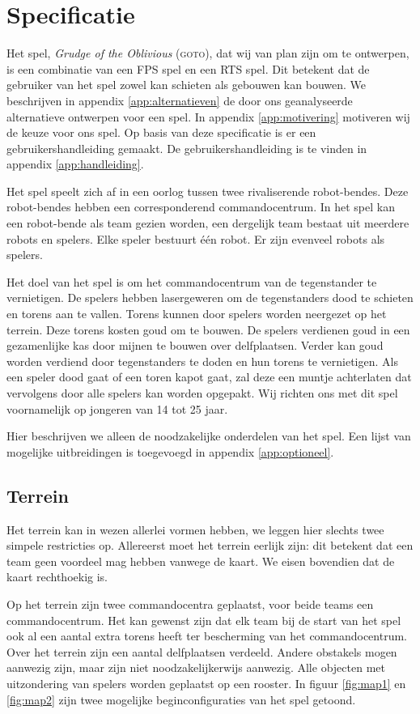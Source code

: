     \section{Specificatie}
    Het spel, \emph{Grudge of the Oblivious} (\textsc{goto}), dat wij van plan zijn om te ontwerpen, is een combinatie van een FPS spel en een RTS spel. Dit betekent dat de gebruiker van het spel zowel kan schieten als gebouwen kan bouwen. We beschrijven in appendix \ref{app:alternatieven} de door ons geanalyseerde alternatieve ontwerpen voor een spel. In appendix \ref{app:motivering} motiveren wij de keuze voor ons spel. Op basis van deze specificatie is er een gebruikershandleiding gemaakt. De gebruikershandleiding is te vinden in appendix \ref{app:handleiding}. 
    
    Het spel speelt zich af in een oorlog tussen twee rivaliserende robot-bendes. Deze robot-bendes hebben een corresponderend commandocentrum. In het spel kan een robot-bende als team gezien worden, een dergelijk team bestaat uit meerdere robots en spelers. Elke speler bestuurt \'e\'en robot. Er zijn evenveel robots als spelers.

    Het doel van het spel is om het commandocentrum van de tegenstander te vernietigen. De spelers hebben lasergeweren om de tegenstanders dood te schieten en torens aan te vallen. Torens kunnen door spelers worden neergezet op het terrein. Deze torens kosten goud om te bouwen. De spelers verdienen goud in een gezamenlijke kas door mijnen te bouwen over delfplaatsen. Verder kan goud worden verdiend door tegenstanders te doden en hun torens te vernietigen. Als een speler dood gaat of een toren kapot gaat, zal deze een muntje achterlaten dat vervolgens door alle spelers kan worden opgepakt. Wij richten ons met dit spel voornamelijk op jongeren van 14 tot 25 jaar.

    Hier beschrijven we alleen de noodzakelijke onderdelen van het spel. Een lijst van mogelijke uitbreidingen is toegevoegd in appendix \ref{app:optioneel}.

	\subsection{Terrein}
    Het terrein kan in wezen allerlei vormen hebben, we leggen hier slechts twee simpele restricties op. Allereerst moet het terrein eerlijk zijn: dit betekent dat een team geen voordeel mag hebben vanwege de kaart. We eisen bovendien dat de kaart rechthoekig is.

    Op het terrein zijn twee commandocentra geplaatst, voor beide teams een commandocentrum. Het kan gewenst zijn dat elk team bij de start van het spel ook al een aantal extra torens heeft ter bescherming van het commandocentrum. Over het terrein zijn een aantal delfplaatsen verdeeld. Andere obstakels mogen aanwezig zijn, maar zijn niet noodzakelijkerwijs aanwezig. Alle objecten met uitzondering van spelers worden geplaatst op een rooster. In figuur \ref{fig:map1} en \ref{fig:map2} zijn twee mogelijke beginconfiguraties van het spel getoond.

